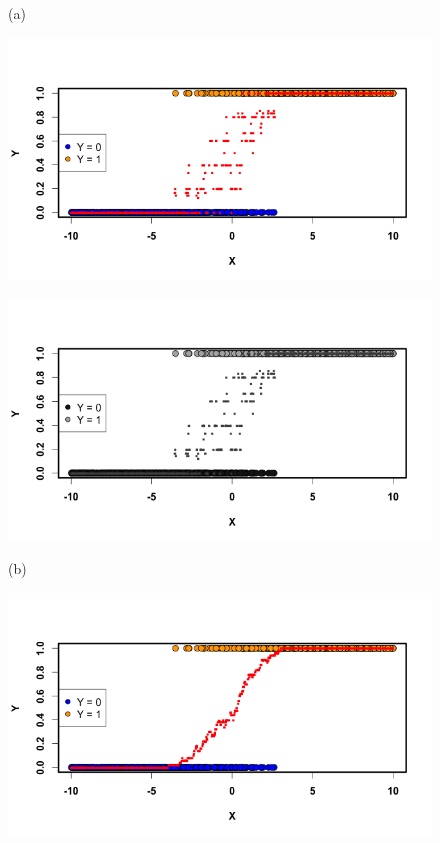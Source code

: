 \begin{ejemplo}
\begin{figure}[tbhp]
\begin{center}
(a)\\[2mm]
\begin{enColor}
\includegraphics[width=14cm]{../fig/Cap13-ClasificadorKnn01.png}\\[2mm]
\end{enColor}
\begin{bn}
\includegraphics[width=14cm]{../fig/Cap13-ClasificadorKnn01-bn.png}\\[2mm]
\end{bn}
(b)\\[2mm]
\begin{enColor}
\includegraphics[width=14cm]{../fig/Cap13-ClasificadorKnn02.png}

\end{enColor}
\end{center}
\end{figure}
\end{ejemplo}
